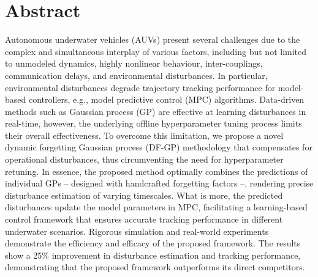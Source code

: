 \documentclass[
10pt, %
b5paper, %
twoside, %
openright  %
]{book}  %
\begin{document}
\section{Abstract}
Autonomous underwater vehicles (AUVs) present several challenges due to the complex and simultaneous interplay of various factors, including but not limited to unmodeled dynamics, highly nonlinear behaviour, inter-couplings, communication delays, and environmental disturbances. In particular, environmental disturbances degrade trajectory tracking performance for model-based controllers, e.g., model predictive control (MPC) algorithms. Data-driven methods such as Gaussian process (GP) are effective at learning disturbances in real-time, however, the underlying offline hyperparameter tuning process limits their overall effectiveness. To overcome this limitation, we propose a novel dynamic forgetting Gaussian process (DF-GP) methodology that compensates for operational disturbances, thus circumventing the need for hyperparameter retuning. In essence, the proposed method optimally combines the predictions of individual GPs -- designed with handcrafted forgetting factors --, rendering precise disturbance estimation of varying timescales. What is more, the predicted disturbances update the model parameters in MPC, facilitating a learning-based control framework that ensures accurate tracking performance in different underwater scenarios. Rigorous simulation and real-world experiments demonstrate the efficiency and efficacy of the proposed framework. The results show a 25\% improvement in disturbance estimation and tracking performance, demonstrating that the proposed framework outperforms its direct competitors.
\newpage



\renewcommand\bibname{Bibliography}  %



% 


\cleardoublepage\null\thispagestyle{empty}


\end{document}
